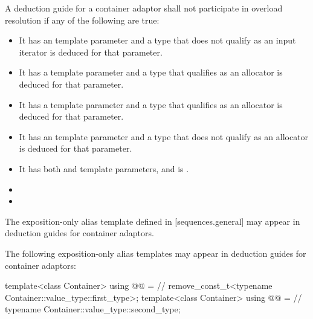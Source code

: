 \pnum
A deduction guide for a container adaptor shall not participate in overload resolution if any of the following are true:
\begin{itemize}
\item It has an  template parameter and a type that does not qualify as an input iterator is deduced for that parameter.
\item It has a  template parameter and a type that qualifies as an allocator is deduced for that parameter.
\item It has a  template parameter and a type that qualifies as an allocator is deduced for that parameter.
\item It has an  template parameter and a type that does not qualify as an allocator is deduced for that parameter.
\item It has both  and  template parameters, and  is .
\item {}
\item {}
\end{itemize}

\pnum
The exposition-only alias template  defined in
[sequences.general] may appear in
deduction guides for container adaptors.

\begin{addedblock}
\pnum
The following exposition-only alias templates may appear in deduction guides
for container adaptors:

\begin{codeblock}
  template<class Container>
    using @@ =                                // \expos
      remove_const_t<typename Container::value_type::first_type>;
  template<class Container>
    using @@ =                             // \expos
      typename Container::value_type::second_type;
\end{codeblock}
\end{addedblock}


